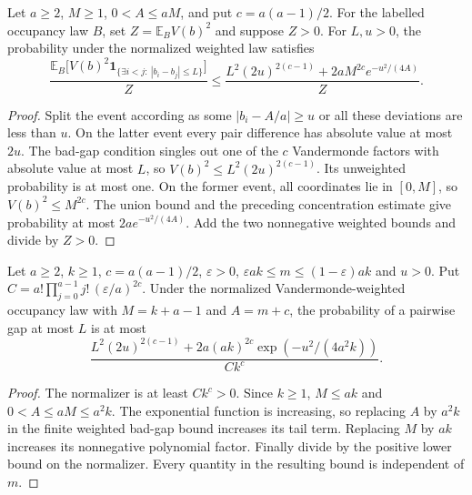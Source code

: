 \begin{lemma}
\label{lem:weighted-bad-gap-bound}
\leanok
Let $a\geq2$, $M\geq1$, $0<A\leq aM$, and put $c=a(a-1)/2$.
For the labelled occupancy law $B$, set
$Z=\mathbb E_B V(b)^2$ and suppose $Z>0$.
For $L,u>0$, the probability under the normalized weighted law satisfies
\[
 \frac{\mathbb E_B\bigl[V(b)^2
   \mathbf1_{\{\exists i<j:\ |b_i-b_j|\leq L\}}\bigr]}{Z}
 \leq\frac{L^2(2u)^{2(c-1)}+
       2aM^{2c}e^{-u^2/(4A)}}{Z}.
\]
\end{lemma}
\begin{proof}
Split the event according as some $|b_i-A/a|\geq u$ or all
these deviations are less than $u$. On the latter event every pair
difference has absolute value at most $2u$. The bad-gap condition
singles out one of the $c$ Vandermonde factors with absolute value
at most $L$, so $V(b)^2\leq L^2(2u)^{2(c-1)}$.
Its unweighted probability is at most one. On the former event,
all coordinates lie in $[0,M]$, so $V(b)^2\leq M^{2c}$.
The union bound and the preceding concentration estimate give probability
at most $2a e^{-u^2/(4A)}$. Add the two nonnegative weighted bounds
and divide by $Z>0$.
\end{proof}

\begin{lemma}
\label{lem:bulk-gap-bound}
\leanok
Let $a\geq2$, $k\geq1$, $c=a(a-1)/2$, $\varepsilon>0$,
$\varepsilon ak\leq m\leq(1-\varepsilon)ak$ and $u>0$.
Put $C=a!\prod_{j=0}^{a-1}j!\,(\varepsilon/a)^{2c}$.
Under the normalized Vandermonde-weighted occupancy law with
$M=k+a-1$ and $A=m+c$, the probability of a pairwise gap at most $L$
is at most
\[
 \frac{L^2(2u)^{2(c-1)}+
  2a(ak)^{2c}\exp(-u^2/(4a^2k))}{Ck^c}.
\]
\end{lemma}
\begin{proof}
The normalizer is at least $Ck^c>0$. Since $k\geq1$,
$M\leq ak$ and $0<A\leq aM\leq a^2k$.
The exponential function is increasing, so replacing $A$ by $a^2k$
in the finite weighted bad-gap bound increases its tail term.
Replacing $M$ by $ak$ increases its nonnegative polynomial factor.
Finally divide by the positive lower bound on the normalizer.
Every quantity in the resulting bound is independent of $m$.
\end{proof}

